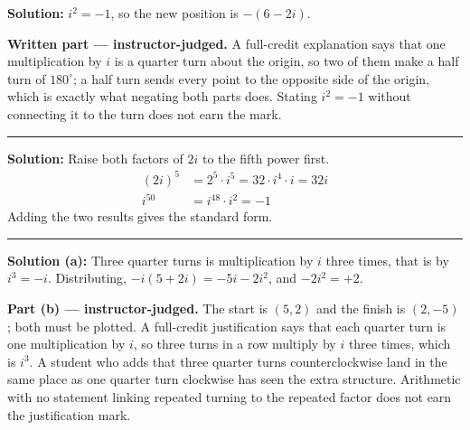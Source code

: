 \documentclass[12pt]{article}
\begin{document}
\textbf{Solution:} $i^{2} = -1$, so the new position is $-(6 - 2i)$. 

\textbf{Written part --- instructor-judged.} A full-credit explanation says that
one multiplication by $i$ is a quarter turn about the origin, so two of them
make a half turn of $180^\circ$; a half turn sends every point to the opposite
side of the origin, which is exactly what negating both parts does. Stating
$i^{2} = -1$ without connecting it to the turn does not earn the mark.

\vspace{0.15cm}
\noindent\rule{\linewidth}{0.2pt}


\textbf{Solution:} Raise both factors of $2i$ to the fifth power first.
\begin{align*}
  (2i)^{5} &= 2^{5} \cdot i^{5} = 32 \cdot i^{4} \cdot i = 32i \\
  i^{50}   &= i^{48} \cdot i^{2} = -1
\end{align*}
Adding the two results gives the standard form. 

\vspace{0.15cm}
\noindent\rule{\linewidth}{0.2pt}


\textbf{Solution (a):} Three quarter turns is multiplication by $i$ three times,
that is by $i^{3} = -i$. Distributing,
$-i(5 + 2i) = -5i - 2i^{2}$, and $-2i^{2} = +2$. 

\textbf{Part (b) --- instructor-judged.} The start is $(5, 2)$ and the finish is
$(2, -5)$; both must be plotted. A full-credit justification says that each
quarter turn is one multiplication by $i$, so three turns in a row multiply by
$i$ three times, which is $i^{3}$. A student who adds that three quarter turns
counterclockwise land in the same place as one quarter turn clockwise has seen
the extra structure. Arithmetic with no statement linking repeated turning to
the repeated factor does not earn the justification mark.
\end{document}
